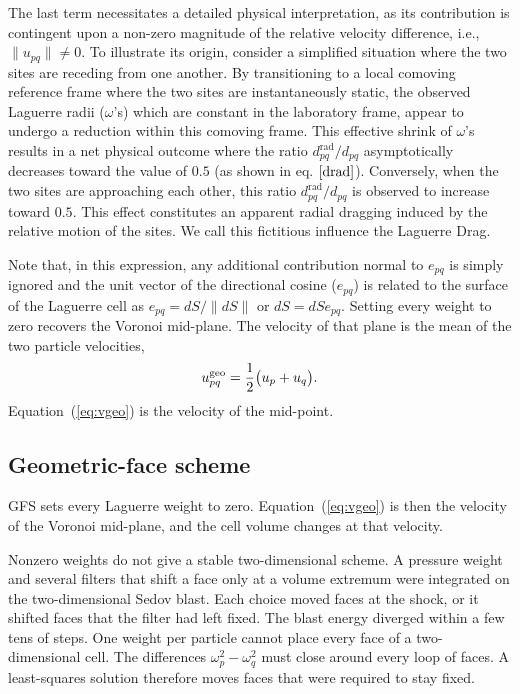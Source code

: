 \documentclass[twocolumn]{aastex63}
\newcommand{\vel}{{u}}
\newcommand{\surf}[0]{S}
\begin{document}
The last term necessitates a detailed physical interpretation, as its contribution is contingent upon a non-zero magnitude of the relative velocity difference, i.e., $\| u_{pq}\| \ne 0$. To illustrate its origin, consider a simplified situation where the two sites are receding from one another. By transitioning to a {local comoving reference frame} where the two sites are instantaneously static, the observed Laguerre radii ($\omega$'s) which are constant in the laboratory frame, appear to undergo a reduction within this comoving frame. This effective shrink of $\omega$'s results in a net physical outcome where the ratio $d_{pq}^\textrm{rad}/d_{pq}$ asymptotically decreases toward the value of $0.5$ (as shown in eq. $\ref{drad}$). Conversely, when the two sites are approaching each other, this ratio $d_{pq}^\textrm{rad}/d_{pq}$ is observed to increase toward $0.5$. This effect constitutes an apparent radial dragging induced by the relative motion of the sites. We  call this fictitious influence the Laguerre Drag.


Note that, in this expression, any additional contribution normal to $e_{pq}$ is simply ignored and the unit vector of the directional cosine ($e_{pq}$) is related to the surface of the Laguerre cell as $e_{pq} = d\surf/\|d\surf\|$ or $d\surf = dS e_{pq}$. Setting every weight to zero recovers the Voronoi mid-plane. The velocity of that plane is the mean of the two particle velocities,
\begin{equation}
	\vel_{pq}^{\rm geo} = \frac12\bigl(\vel_p + \vel_q\bigr).
	\label{eq:vgeo}
\end{equation}
Equation~(\ref{eq:vgeo}) is the velocity of the mid-point.

\subsection{Geometric-face scheme}
\label{sec:adopted}

GFS sets every Laguerre weight to zero. Equation~(\ref{eq:vgeo}) is then the velocity of the Voronoi mid-plane, and the cell volume changes at that velocity.

Nonzero weights do not give a stable two-dimensional scheme. A pressure weight and several filters that shift a face only at a volume extremum were integrated on the two-dimensional Sedov blast. Each choice moved faces at the shock, or it shifted faces that the filter had left fixed. The blast energy diverged within a few tens of steps. One weight per particle cannot place every face of a two-dimensional cell. The differences $\omega_p^2-\omega_q^2$ must close around every loop of faces. A least-squares solution therefore moves faces that were required to stay fixed.
\end{document}
